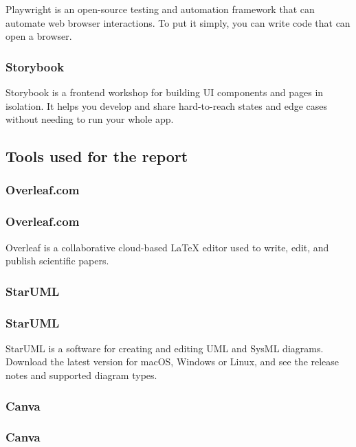 Playwright is an open-source testing and automation framework that can automate web browser interactions. To put it simply, you can write code that can open a browser.

\subsubsection*{\protect{} Storybook}

Storybook is a frontend workshop for building UI components and pages in isolation. It helps you develop and share hard-to-reach states and edge cases without needing to run your whole app.

\subsection{Tools used for the report}

\subsubsection*{\protect{} Overleaf.com}
\subsubsection*{Overleaf.com}

Overleaf is a collaborative cloud-based LaTeX editor used to write, edit, and publish scientific papers.

\subsubsection*{\protect{} StarUML}
\subsubsection*{StarUML}

StarUML is a software for creating and editing UML and SysML diagrams. Download the latest version for macOS, Windows or Linux, and see the release notes and supported diagram types.

\subsubsection*{\protect{} Canva}
\subsubsection*{Canva}

